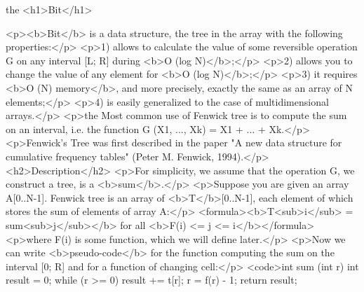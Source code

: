 the <h1>Bit</h1>

<p><b>Bit</b> is a data structure, the tree in the array with the following properties:</p>
<p>1) allows to calculate the value of some reversible operation G on any interval [L; R] during <b>O (log N)</b>;</p>
<p>2) allows you to change the value of any element for <b>O (log N)</b>;</p>
<p>3) it requires <b>O (N) memory</b>, and more precisely, exactly the same as an array of N elements;</p>
<p>4) is easily generalized to the case of multidimensional arrays.</p>
<p>the Most common use of Fenwick tree is to compute the sum on an interval, i.e. the function G (X1, ..., Xk) = X1 + ... + Xk.</p>
<p>Fenwick's Tree was first described in the paper "A new data structure for cumulative frequency tables" (Peter M. Fenwick, 1994).</p>
<h2>Description</h2>
<p>For simplicity, we assume that the operation G, we construct a tree, is a <b>sum</b>.</p>
<p>Suppose you are given an array A[0..N-1]. Fenwick tree is an array of <b>T</b>[0..N-1], each element of which stores the sum of elements of array A:</p>
<formula><b>T<sub>i</sub> = sum<sub>j</sub></b> for all <b>F(i) <= j <= i</b></formula>
<p>where F(i) is some function, which we will define later.</p>
<p>Now we can write <b>pseudo-code</b> for the function computing the sum on the interval [0; R] and for a function of changing cell:</p>
<code>int sum (int r)
{
int result = 0;
while (r >= 0) {
result += t[r];
r = f(r) - 1;
}
return result;
}


